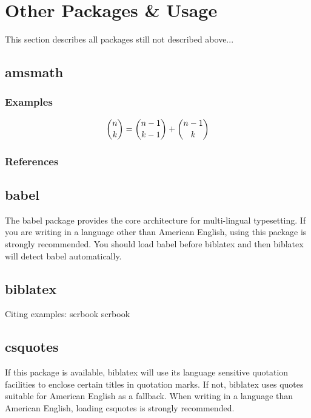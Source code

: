 \section{Other Packages \& Usage}
This section describes all packages still not described above...
\subsection{amsmath}
\subsubsection{Examples}
$$\dbinom{n}{k} = \dbinom{n-1}{k-1} +\dbinom{n-1}{k}$$
\subsubsection{References}

\subsection{babel}
The babel package provides the core architecture for multi-lingual typesetting.
If you are writing in a language other than American English, using this package
is strongly recommended. You should load babel before biblatex and then biblatex
will detect babel automatically.

\subsection{biblatex}
Citing examples:
scrbook \autocite{KOH19}\newline
scrbook \autocite{TEXWELT14}

\subsection{csquotes}
If this package is available, biblatex will use its language sensitive quotation
facilities to enclose certain titles in quotation marks. If not, biblatex uses
quotes suitable for American English as a fallback. When writing in a language
than American English, loading csquotes is strongly recommended.

